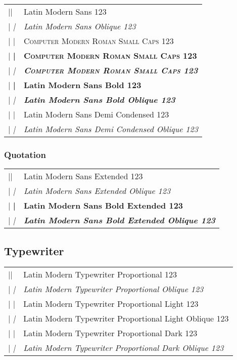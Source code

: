 \documentclass{article}
\makeatletter
\newenvironment{vrb}{\begin{tabular}{@{}p{6cm}l@{}}}{\end{tabular}}
\makeatother
\begin{document}
\sffamily
\begin{vrb}
|\sffamily| & {Latin Modern Sans 123} \\
|   \slshape| & {\slshape Latin Modern Sans Oblique 123} \\
|   \scshape| & {\scshape Computer Modern Roman Small Caps 123} \\
|      \bfseries| & {\bfseries\scshape Computer Modern Roman Small Caps 123} \\
|         \itshape| & {\itshape\bfseries\scshape Computer Modern Roman Small Caps 123} \\
|   \bfseries| & {\bfseries Latin Modern Sans Bold 123} \\
|      \slshape| & {\bfseries\slshape Latin Modern Sans Bold Oblique 123} \\
|   \fontseries{sbc}\selectfont| & {\fontseries{sbc}\selectfont Latin Modern Sans Demi Condensed 123} \\
|      \slshape| & {\fontseries{sbc}\selectfont\slshape Latin Modern Sans Demi Condensed Oblique 123} \\
\end{vrb}

\subsubsection*{Quotation}

\qtstyle
\begin{vrb}
|\qtstyle | & {Latin Modern Sans Extended 123} \\
|   \slshape | & {\slshape Latin Modern Sans Extended Oblique 123} \\
|   \bfseries | & {\bfseries Latin Modern Sans Bold Extended 123} \\
|      \slshape | & {\bfseries\slshape Latin Modern Sans Bold Extended Oblique 123} \\
\end{vrb}

\subsection*{Typewriter}

\ttfamily
\tvstyle
\begin{vrb}
|\ttfamily | & {Latin Modern Typewriter Proportional 123} \\
|   \slshape | & {\slshape Latin Modern Typewriter Proportional Oblique 123} \\
|   \lgweight | & {\lgweight Latin Modern Typewriter Proportional Light 123} \\
|   \lgweight\slshape | & {\lgweight Latin Modern Typewriter Proportional Light Oblique 123} \\
|   \fontseries{b}\selectfont | & {\fontseries{b}\selectfont Latin Modern Typewriter Proportional Dark 123} \\
|      \slshape | & {\fontseries{b}\slshape Latin Modern Typewriter Proportional Dark Oblique 123} \\
\end{vrb}
\end{document}
